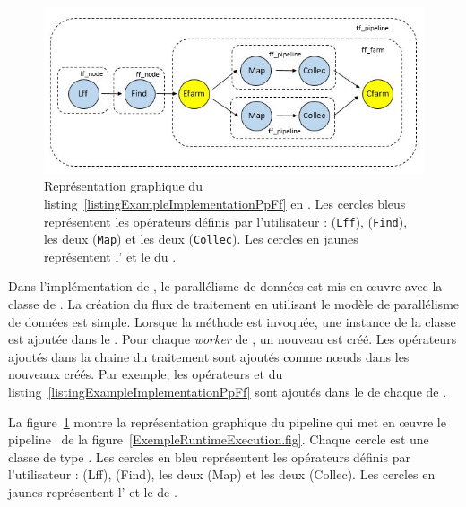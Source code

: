 \begin{figure}[htb]
\centering
     \includegraphics[width=\textwidth]{Figures/ExempleRuntimeExecutionFF.jpg}
      \caption[Repr\'esentation graphique du listing~\ref{listingExampleImplementationPpFf} en .]{Repr\'esentation graphique du listing~\ref{listingExampleImplementationPpFf} en . Les cercles bleus repr\'esentent les op\'erateurs d\'efinis par l'utilisateur :  (\texttt{Lff}),  (\texttt{Find}), les deux  (\texttt{Map}) et les deux  (\texttt{Collec}). Les cercles en jaunes repr\'esentent l' et le  du .}
       \label{ExempleRuntimeExecutionFF.fig}
\end{figure}


Dans l'impl\'ementation de , le parall\'elisme de donn\'ees est mis en œuvre avec la classe  de . La cr\'eation du flux de traitement en utilisant le mod\`ele de parall\'elisme de donn\'ees est simple. Lorsque la m\'ethode  est invoqu\'ee, une instance de la classe  est ajout\'ee dans le . Pour chaque \emph{worker} de , un nouveau  est cr\'e\'e. Les op\'erateurs ajout\'es dans la chaine du traitement  sont ajout\'es comme nœuds dans les nouveaux  cr\'e\'es. Par exemple, les op\'erateurs  et  du listing~\ref{listingExampleImplementationPpFf} sont ajout\'es dans le  de chaque  de . 

La figure~\ref{ExempleRuntimeExecutionFF.fig} montre la repr\'esentation graphique du pipeline  qui met en \oe{}uvre le pipeline \PpFf\ de la figure~\ref{ExempleRuntimeExecution.fig}. Chaque cercle est une classe de type . Les cercles en bleu repr\'esentent les op\'erateurs d\'efinis par l'utilisateur :  (Lff),  (Find), les deux  (Map) et les deux  (Collec). Les cercles en jaunes repr\'esentent l' et le  de . 


